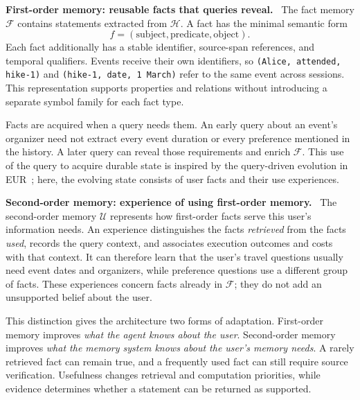 \documentclass[10pt,twocolumn]{article}
\newcommand{\Hh}{\mathcal{H}}
\newcommand{\Ff}{\mathcal{F}}
\newcommand{\Uu}{\mathcal{U}}
\newcommand{\runin}[1]{\smallskip\noindent\textbf{#1.}\ }
\begin{document}
\runin{First-order memory: reusable facts that queries reveal}
The fact memory $\Ff$ contains statements extracted from $\Hh$. A fact
has the minimal semantic form
\begin{equation}
\label{eq:new-fact}
f=(\mathrm{subject},\mathrm{predicate},\mathrm{object}).
\end{equation}
Each fact additionally has a stable identifier, source-span references,
and temporal qualifiers. Events receive their own identifiers, so
\texttt{(Alice, attended, hike-1)} and
\texttt{(hike-1, date, 1 March)} refer to the same event across sessions.
This representation supports properties and relations without
introducing a separate symbol family for each fact type.

Facts are acquired when a query needs them. An early query about an
event's organizer need not extract every event duration or every
preference mentioned in the history. A later query can reveal those
requirements and enrich $\Ff$. This use of the query to acquire durable
state is inspired by the query-driven evolution in EUR~\cite{eur}; here,
the evolving state consists of user facts and their use experiences.

\runin{Second-order memory: experience of using first-order memory}
The second-order memory $\Uu$ represents how first-order facts serve
this user's information needs. An experience distinguishes the facts
\emph{retrieved} from the facts \emph{used}, records the query context,
and associates execution outcomes and costs with that context. It can
therefore learn that the user's travel questions usually need event
dates and organizers, while preference questions use a different group
of facts. These experiences concern facts already in $\Ff$; they do not
add an unsupported belief about the user.

This distinction gives the architecture two forms of adaptation.
First-order memory improves \emph{what the agent knows about the user}.
Second-order memory improves \emph{what the memory system knows about
the user's memory needs}. A rarely retrieved fact can remain true, and
a frequently used fact can still require source verification. Usefulness
changes retrieval and computation priorities, while evidence determines
whether a statement can be returned as supported.
\end{document}
